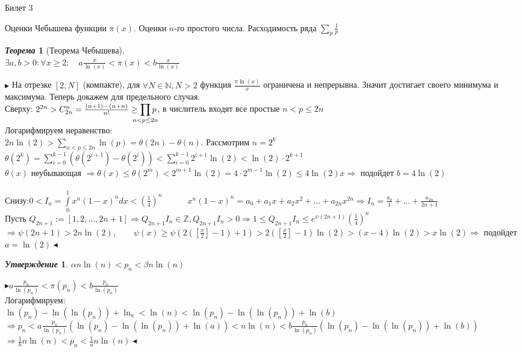 \documentclass[a4paper,12pt]{article}
\newtheorem{teo}{\textit{Теорема}}
\newtheorem{utv}{\textit{Утверждение}}
\newcommand{\TE}{\theta}
\newcommand{\SI}{\psi}
\newcommand{\q}{\quad}
\newcommand{\pb}{\blacktriangleright}
\newcommand{\pe}{\blacktriangleleft}
\newcommand{\Ra}{\Rightarrow}
\newcommand{\bb}[1]{\mathbb{#1}}
\newcommand{\SL}{\sum\limits}
\newcommand{\IL}{\int\limits}
\newcommand{\os}{\left(}
\newcommand{\cs}{\right)}
\begin{document}
\newpage
\begin{mybox}{\hypertarget{bil3}{Билет 3}}

\begin{formbox}{}
Оценки Чебышева функции $\pi(x)$. Оценки $n$-го простого числа. Расходимость ряда $\sum_p \frac{1}{p}$
\end{formbox}

\begin{formbox}{}
\begin{teo}[Теорема Чебышева]\q\\
$\exists a,b > 0: \forall x \ge 2:\q a\frac{x}{\ln(x)} <\pi(x) <b\frac{x}{\ln(x)} $
\end{teo}
\end{formbox}
$\pb$ 
На отрезке $[2, N]$ (компакте), для $\forall N \in \bb{N}, N > 2$ функция $\frac{\pi \ln(x)}{x}$ ограничена и непрерывна. Значит достигает своего минимума и максимума. Теперь докажем для предельного случая. \\
Сверху: $2^{2n} > C_{2n}^n = \frac{(n+1)\cdots(n+n)}{n!}\ge \smashoperator{\prod_{n<p\le 2n}} p $, в числитель входят все простые $n < p \le 2n$\\
Логарифмируем неравенство:\\
$2n\ln(2) > \SL_{n < p \le 2n}\ln(p) = \TE(2n) - \TE(n) $. Рассмотрим $n = 2^k$\\
$\TE(2^k) = \SL_{i=0}^{k-1} (\TE(2^{i+1}) - \TE(2^i)) < \SL_{i=0}^{k-1} 2^{i+1}\ln(2) < \ln(2)  \cdot 2^{k+1}  $\\
$\TE(x)$ неубывающая $\Ra \TE(x) \le \TE(2^m)< 2^{m+1} \ln(2) = 4 \cdot 2^{m-1}\ln(2) \le 4\ln(2)x\Ra  $ подойдет $b = 4\ln(2)$\\\q\\
Снизу:$0 < I_n = \IL_0^1 x^n(1-x)^n dx< \os \frac{1}{4} \cs^n\q\q\q x^n(1-x)^n = a_0 + a_1x + a_2x^2 +\dots +a_{2n}x^{2n}\Ra I_n = \frac{a_0}{1} + \dots + \frac{a_{2n}}{2n+1}  $\\
Пусть $Q_{2n+1} := [1,2,\dots, 2n+1]\Ra Q_{2n+1}I_n\in \bb{Z}  , Q_{2n+1}I_n > 0\Ra 1 \le  Q_{2n+1}I_n \le  e^{\SI(2n+1)}  \os \frac{1}{4} \cs^n    $\\
$\Ra  \SI(2n+1) >2n\ln(2), \q\q \SI(x) \ge \SI(2(\left[\frac{x}{2}\right] - 1) + 1) > 2(\left[\frac{x}{2}\right] - 1)\ln(2) > (x-4)\ln(2) > x\ln(2) \Ra $ подойдет $a = \ln(2)\pe$

\begin{formbox}{}
\begin{utv} $\alpha n \ln(n) < p_n < \beta n \ln(n)   $
\end{utv}
\end{formbox}
$\pb a \frac{p_n}{\ln(p_n)} < \pi(p_n) < b \frac{p_n}{\ln(p_n)} $\\
Логарифмируем:\\
$\ln(p_n)  -\ln(\ln(p_n)) + \ln_a < \ln(n) < \ln (p_n) - \ln(\ln(p_n)) + \ln(b)  $\\
$\Ra p_n < a \frac{p_n}{\ln(p_n)} (\ln(p_n) - \ln(\ln(p_n)) + \ln(a))   < n \ln(n) <  b \frac{p_n}{\ln(p_n)} (\ln(p_n) - \ln(\ln(p_n)) + \ln(b))$\\$ \Ra \frac{1}{b} n \ln(n) < p_n < \frac{1}{a}n \ln(n)\pe $


\end{mybox}
\end{document}
